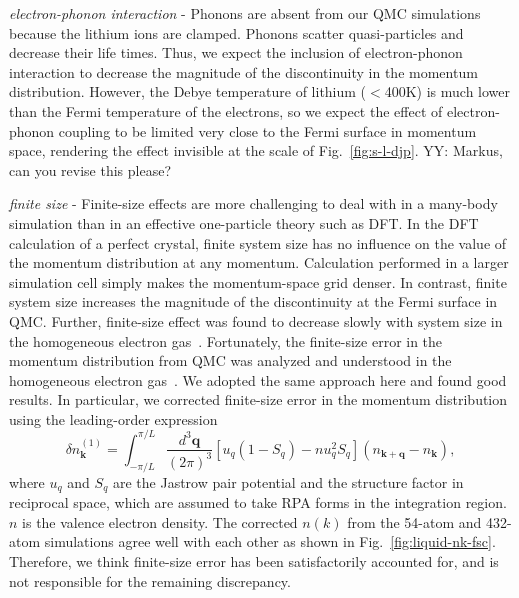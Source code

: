 \documentclass[aps,prb,showpacs,preprintnumbers,amsmath,amssymb,superscriptaddress,twocolumn]{revtex4-1}
\newcommand{\bs}{\boldsymbol}
\begin{document}

\emph{electron-phonon interaction} - Phonons are absent from our QMC simulations because the lithium ions are clamped. Phonons scatter quasi-particles and decrease their life times. Thus, we expect the inclusion of electron-phonon interaction to decrease the magnitude of the discontinuity in the momentum distribution. However, the Debye temperature of lithium ($<$400K) is much lower than the Fermi temperature of the electrons, so we expect the effect of electron-phonon coupling to be limited very close to the Fermi surface in momentum space, rendering the effect invisible at the scale of Fig.~\ref{fig:s-l-djp}.
{\color{red}YY: Markus, can you revise this please?}

\emph{finite size} - Finite-size effects are more challenging to deal with in a many-body simulation than in an effective one-particle theory such as DFT. In the DFT calculation of a perfect crystal, finite system size has no influence on the value of the momentum distribution at any momentum. Calculation performed in a larger simulation cell simply makes the momentum-space grid denser. In contrast, finite system size increases the magnitude of the discontinuity at the Fermi surface in QMC. Further, finite-size effect was found to decrease slowly with system size in the homogeneous electron gas~\cite{Holzmann2009}. Fortunately, the finite-size error in the momentum distribution from QMC was analyzed and understood in the homogeneous electron gas~\cite{Holzmann2009,Holzmann2011}. We adopted the same approach here and found good results. In particular, we corrected finite-size error in the momentum distribution using the leading-order expression
\begin{equation} \label{eq:nk-fsc}
\delta n_{\bs{k}}^{(1)} = \int_{-\pi/L}^{\pi/L} \frac{d^3\bs{q}}{(2\pi)^3} \left[
u_q (1-S_q) - nu_q^2 S_q
\right] (n_{\bs{k}+\bs{q}}-n_{\bs{k}}),
\end{equation}
where $u_q$ and $S_q$ are the Jastrow pair potential and the structure factor in reciprocal space, which are assumed to take RPA forms in the integration region. $n$ is the valence electron density. The corrected $n(k)$ from the 54-atom and 432-atom simulations agree well with each other as shown in Fig.~\ref{fig:liquid-nk-fsc}. Therefore, we think finite-size error has been satisfactorily accounted for, and is not responsible for the remaining discrepancy.
\end{document}
